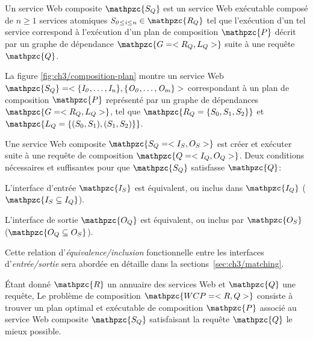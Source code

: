 \begin{mydef}
  Un service Web composite $\mathpzc{S_Q}$ est un service Web
  exécutable composé de $n \geq 1$ services atomiques
  $\mathit{S_{0 \leq i \leq n}} \in \mathpzc{R_Q}$ tel que l'exécution
  d'un tel service correspond à l'exécution d'un plan de composition
  $\mathpzc{P}$ décrit par un graphe de dépendance
  $\mathpzc{G = <R_Q,L_Q>}$ suite à une requête $\mathpzc{Q}$.\medskip
\end{mydef}

La figure \ref{fig:ch3/composition-plan} montre un service Web
$\mathpzc{S_Q} = <\mathit{\{I_0, \dots, I_n\}}, \mathit{\{O_0, \dots,
  O_m\}}>$
correspondant à un plan de composition $\mathpzc{P}$ représenté par un
graphe de dépendances $\mathpzc{G =<R_Q,L_Q>}$, tel que
$\mathpzc{R_Q = \{S_0, S_1, S_2\}}$ et
$\mathpzc{L_Q = \{(S_0, S_1), (S_1, S_2)\}}$.\medskip

Une service Web composite $\mathpzc{S_Q = <I_S, O_S>}$ est créer et
exécuter suite à une requête de composition $\mathpzc{Q=<I_Q, O_Q>}$.
Deux conditions nécessaires et suffisantes pour que $\mathpzc{S_Q}$
satisfasse $\mathpzc{Q}$:\medskip

\begin{enumerateRoman}
\item L'interface d'entrée $\mathpzc{I_S}$ est équivalent, ou inclus
  dans $\mathpzc{I_Q}$ ($\mathpzc{I_S \subseteq I_Q}$).

\item L'interface de sortie $\mathpzc{O_Q}$ est équivalent, ou inclus
  par $\mathpzc{O_S}$ ($\mathpzc{O_Q \subseteq O_S}$).\medskip
\end{enumerateRoman}
\enddescription

Cette relation d'\emph{équivalence/inclusion} fonctionnelle entre les
interfaces d'\emph{entrée/sortie} sera abordée en détaille dans la
sections~\ref{sec:ch3/matching}.\medskip

\begin{mydef}
  Étant donné $\mathpzc{R}$ un annuaire des services Web et
  $\mathpzc{Q}$ une requête, Le problème de composition
  $\mathpzc{WCP=<R,Q>}$ consiste à trouver un plan optimal et
  exécutable de composition $\mathpzc{P}$ associé au service Web
  composite $\mathpzc{S_Q}$ satisfaisant la requête $\mathpzc{Q}$ le
  mieux possible.\medskip
\end{mydef}



